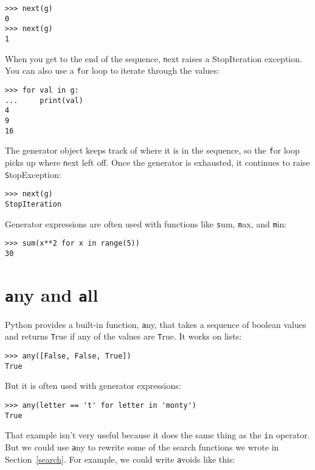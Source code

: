 \documentclass[
DIV=11,
fontsize=12,
twoside,
headinclude=false,
titlepage=firstiscover,
abstract=true,
headsepline=true,
footsepline=true,
chapterprefix=true, %
headings=big,
bibliography=totoc,%
captions=tableheading
]{scrbook}
\theoremstyle{definition}
\begin{document}
\begin{lstlisting}
>>> next(g)
0
>>> next(g)
1
\end{lstlisting}
%
When you get to the end of the sequence, {\texttt next} raises a 
StopIteration exception.  You can also use a {\texttt for} loop to iterate
through the values:

\begin{lstlisting}
>>> for val in g:
...     print(val)
4
9
16
\end{lstlisting}
%
The generator object keeps track of where it is in the sequence,
so the {\texttt for} loop picks up where {\texttt next} left off.  Once the
generator is exhausted, it continues to raise {\texttt StopException}:

\begin{lstlisting}
>>> next(g)
StopIteration
\end{lstlisting}

Generator expressions are often used with functions like {\texttt sum},
{\texttt max}, and {\texttt min}:

\begin{lstlisting}
>>> sum(x**2 for x in range(5))
30
\end{lstlisting}


\section{{\texttt any} and {\texttt all}}

Python provides a built-in function, {\texttt any}, that takes a sequence
of boolean values and returns {\texttt True} if any of the values are {\texttt
  True}.  It works on lists:

\begin{lstlisting}
>>> any([False, False, True])
True
\end{lstlisting}
%
But it is often used with generator expressions:

\begin{lstlisting}
>>> any(letter == 't' for letter in 'monty')
True
\end{lstlisting}
%
That example isn't very useful because it does the same thing
as the {\texttt in} operator.  But we could use {\texttt any} to rewrite
some of the search functions we wrote in Section~\ref{search}.  For
example, we could write {\texttt avoids} like this:
\end{document}
